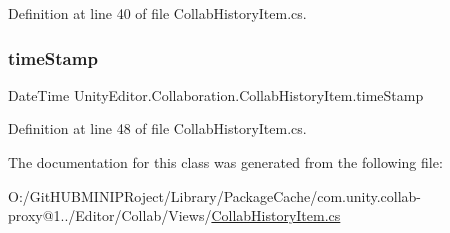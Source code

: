 Definition at line 40 of file Collab\+History\+Item.\+cs.

\mbox{\label{class_unity_editor_1_1_collaboration_1_1_collab_history_item_af1e6d8e67a2c5a071fb8624d404aea11}} 
\subsubsection{\texorpdfstring{timeStamp}{timeStamp}}
{\footnotesize\ttfamily Date\+Time Unity\+Editor.\+Collaboration.\+Collab\+History\+Item.\+time\+Stamp\hspace{0.3cm}{\ttfamily [get]}}



Definition at line 48 of file Collab\+History\+Item.\+cs.



The documentation for this class was generated from the following file\+:\begin{DoxyCompactItemize}
\item 
O\+:/\+Git\+H\+U\+B\+M\+I\+N\+I\+P\+Roject/\+Library/\+Package\+Cache/com.\+unity.\+collab-\/proxy@1../\+Editor/\+Collab/\+Views/\mbox{\hyperlink{_collab_history_item_8cs}{Collab\+History\+Item.\+cs}}\end{DoxyCompactItemize}
